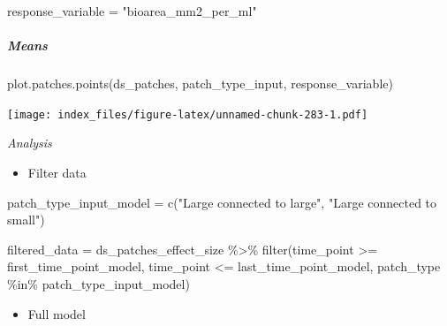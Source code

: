 \documentclass[
]{article}
\newenvironment{Shaded}{\begin{snugshade}}{\end{snugshade}}
\newcommand{\FunctionTok}[1]{\textcolor[rgb]{0.00,0.00,0.00}{#1}}
\newcommand{\NormalTok}[1]{#1}
\newcommand{\OtherTok}[1]{\textcolor[rgb]{0.56,0.35,0.01}{#1}}
\newcommand{\SpecialCharTok}[1]{\textcolor[rgb]{0.00,0.00,0.00}{#1}}
\newcommand{\StringTok}[1]{\textcolor[rgb]{0.31,0.60,0.02}{#1}}
\providecommand{\tightlist}{%
  \setlength{\itemsep}{0pt}\setlength{\parskip}{0pt}}
\begin{document}
\begin{Shaded}
\begin{Highlighting}[]
\NormalTok{response\_variable }\OtherTok{=} \StringTok{"bioarea\_mm2\_per\_ml"}
\end{Highlighting}
\end{Shaded}

\hypertarget{means-16}{%
\subparagraph{Means}\label{means-16}}

\begin{Shaded}
\begin{Highlighting}[]
\FunctionTok{plot.patches.points}\NormalTok{(ds\_patches, patch\_type\_input,}
\NormalTok{                       response\_variable)}
\end{Highlighting}
\end{Shaded}

\texttt{[image: index\_files/figure-latex/unnamed-chunk-283-1.pdf]}

\emph{Analysis}

\begin{itemize}
\tightlist
\item
  Filter data
\end{itemize}

\begin{Shaded}
\begin{Highlighting}[]
\NormalTok{patch\_type\_input\_model }\OtherTok{=} \FunctionTok{c}\NormalTok{(}\StringTok{"Large connected to large"}\NormalTok{,}
                                 \StringTok{"Large connected to small"}\NormalTok{)}

\NormalTok{filtered\_data }\OtherTok{=}\NormalTok{ ds\_patches\_effect\_size }\SpecialCharTok{\%\textgreater{}\%}
                         \FunctionTok{filter}\NormalTok{(time\_point }\SpecialCharTok{\textgreater{}=}\NormalTok{ first\_time\_point\_model,}
\NormalTok{                                time\_point }\SpecialCharTok{\textless{}=}\NormalTok{ last\_time\_point\_model,}
\NormalTok{                                patch\_type }\SpecialCharTok{\%in\%}\NormalTok{ patch\_type\_input\_model)}
\end{Highlighting}
\end{Shaded}

\begin{itemize}
\tightlist
\item
  Full model
\end{itemize}
\end{document}
